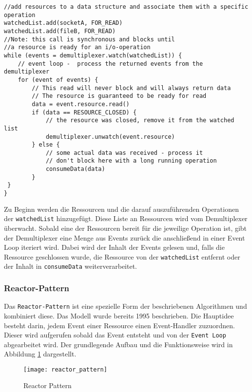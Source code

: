\begin{lstlisting}[caption=Pseudocode-Beispiel für Synchronous Event Demultiplexing mit Event Loop,
captionpos=b, label=lst:EventLoop_Pseudocode]
//add resources to a data structure and associate them with a specific operation
watchedList.add(socketA, FOR_READ)
watchedList.add(fileB, FOR_READ)
//Note: this call is synchronous and blocks until
//a resource is ready for an i/o-operation
while (events = demultiplexer.watch(watchedList)) {
	// event loop -  process the returned events from the demultiplexer
	for (event of events) {
		// This read will never block and will always return data
		// The resource is guaranteed to be ready for read
		data = event.resource.read()
		if (data == RESOURCE_CLOSED) {
			// the resource was closed, remove it from the watched list
			demultiplexer.unwatch(event.resource)
		} else {
			// some actual data was received - process it 
			// don't block here with a long running operation
			consumeData(data)
		}
 }
}
\end{lstlisting}
Zu Beginn werden die Ressourcen und die darauf auszuführenden Operationen der \verb|watchedList| hinzugefügt.
Diese Liste an Ressourcen wird vom Demultiplexer überwacht. Sobald eine der Ressourcen bereit
für die jeweilige Operation ist, gibt der Demultiplexer eine Menge aus Events zurück die anschließend in einer
Event Loop iteriert wird. Dabei wird der Inhalt der Events gelesen und, falls die Ressource
geschlossen wurde, die Ressource von der \verb|watchedList| entfernt oder der Inhalt in \verb|consumeData| weiterverarbeitet.
\parencite[Event Demultiplexing]{NodeJSDesignPatterns}

\newpage
\subsubsection{Reactor-Pattern}
\label{subsubsec:reactor_pattern}
Das \verb|Reactor-Pattern| ist eine spezielle Form der beschriebenen Algorithmen und kombiniert diese.
Das Modell wurde bereits 1995 beschrieben.\parencite{SchmidtReactorPattern}
Die Hauptidee besteht darin, jedem Event einer Ressource einen Event-Handler zuzuordnen.
Dieser wird aufgerufen sobald das Event entsteht und von der \verb|Event Loop| abgearbeitet wird.
Der grundlegende Aufbau und die Funktionsweise wird in Abbildung \ref{fig:reactor_pattern} dargestellt.
\begin{figure}[H]
  \centering
  \texttt{[image: reactor\_pattern]}
  \caption{Reactor Pattern \parencite[Abbildung 1.3]{NodeJSDesignPatterns}}
  \label{fig:reactor_pattern}
\end{figure}

